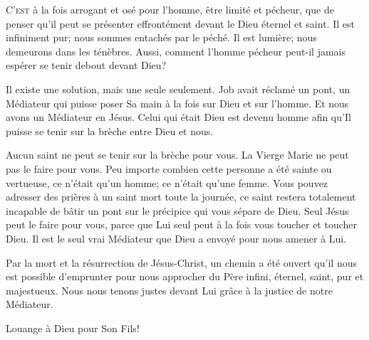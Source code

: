 


\lettrine{C}{'est} à la fois arrogant et osé pour l'homme,
 être limité et pécheur, que de penser qu'il peut se présenter
 effrontément devant le Dieu éternel et saint.
 Il est infiniment pur; nous sommes entachés par le péché.
 Il est lumière; nous demeurons dans les ténèbres.
 Aussi, comment l'homme pécheur peut-il jamais espérer
 se tenir debout devant Dieu?

Il existe une solution, mais une seule seulement.
 Job avait réclamé un pont, un Médiateur qui puisse poser Sa main
 à la fois sur Dieu et sur l'homme. Et nous avons un Médiateur en Jésus.
 Celui qui était Dieu est devenu homme afin qu'Il puisse se tenir
 sur la brèche entre Dieu et nous.


Aucun saint ne peut se tenir sur la brèche pour vous.
 La Vierge Marie ne peut pas le faire pour vous.
 Peu importe combien cette personne a été sainte ou vertueuse,
 ce n'était qu'un homme; ce n'était qu'une femme.
 Vous pouvez adresser des prières à un saint mort toute la journée,
 ce saint restera totalement incapable de bâtir un pont sur le précipice
 qui vous sépare de Dieu. Seul Jésus peut le faire pour vous,
 parce que Lui seul peut à la fois vous toucher et toucher Dieu.
 Il est le seul vrai Médiateur que Dieu a envoyé pour nous amener à Lui.

Par la mort et la résurrection de Jésus-Christ, un chemin a été ouvert
 qu'il nous est possible d'emprunter pour nous approcher du Père infini,
 éternel, saint, pur et majestueux. 
Nous nous tenons justes devant Lui grâce à la justice de notre Médiateur.

Louange à Dieu pour Son Fils!

\dvrule





